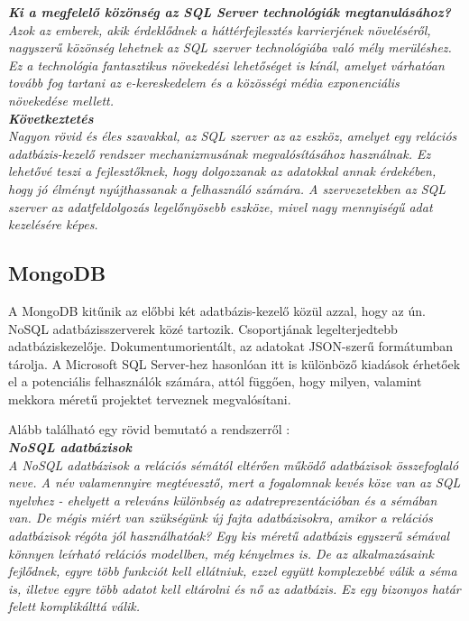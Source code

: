 \noindent\textit{\textbf{Ki a megfelelő közönség az SQL Server technológiák megtanulásához?}}\\

\textit{Azok az emberek, akik érdeklődnek a háttérfejlesztés karrierjének növeléséről, nagyszerű közönség lehetnek az SQL szerver technológiába való mély merüléshez. Ez a technológia fantasztikus növekedési lehetőséget is kínál, amelyet várhatóan tovább fog tartani az e-kereskedelem és a közösségi média exponenciális növekedése mellett.}\\

\noindent\textit{\textbf{Következtetés}}\\

\textit{Nagyon rövid és éles szavakkal, az SQL szerver az az eszköz, amelyet egy relációs adatbázis-kezelő rendszer mechanizmusának megvalósításához használnak. Ez lehetővé teszi a fejlesztőknek, hogy dolgozzanak az adatokkal annak érdekében, hogy jó élményt nyújthassanak a felhasználó számára. A szervezetekben az SQL szerver az adatfeldolgozás legelőnyösebb eszköze, mivel nagy mennyiségű adat kezelésére képes.}


\subsection{MongoDB}

A MongoDB kitűnik az előbbi két adatbázis-kezelő közül azzal, hogy az ún. NoSQL adatbázisszerverek közé tartozik. Csoportjának legelterjedtebb adatbáziskezelője. Dokumentumorientált, az adatokat JSON-szerű formátumban tárolja. 
A Microsoft SQL Server-hez hasonlóan itt is különböző kiadások érhetőek el a potenciális felhasználók számára, attól függően, hogy milyen, valamint mekkora méretű projektet terveznek megvalósítani.

Alább található egy rövid bemutató a rendszerről \cite{mongodbcikk}:\\

\noindent\textit{\textbf{\large{NoSQL adatbázisok}}}\\

\textit{A NoSQL adatbázisok a relációs sémától eltérően működő adatbázisok összefoglaló neve. A név valamennyire megtévesztő, mert a fogalomnak kevés köze van az SQL nyelvhez - ehelyett a releváns különbség az adatreprezentációban és a sémában van. De mégis miért van szükségünk új fajta adatbázisokra, amikor a relációs adatbázisok régóta jól használhatóak? Egy kis méretű adatbázis egyszerű sémával könnyen leírható relációs modellben, még kényelmes is. De az alkalmazásaink fejlődnek, egyre több funkciót kell ellátniuk, ezzel együtt komplexebbé válik a séma is, illetve egyre több adatot kell eltárolni és nő az adatbázis. Ez egy bizonyos határ felett komplikálttá válik.}

